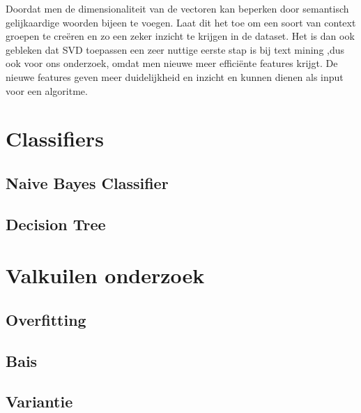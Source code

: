 Doordat men de dimensionaliteit van de vectoren kan beperken door semantisch gelijkaardige woorden bijeen te voegen. Laat dit het toe om een soort van context groepen te cre\"eren en zo een zeker inzicht te krijgen in de dataset. Het is dan ook gebleken dat SVD toepassen een zeer nuttige eerste stap is bij text mining \cite{maas2011learning},dus ook voor ons onderzoek, omdat men nieuwe meer effici\"ente features krijgt. De nieuwe features geven meer duidelijkheid en inzicht en kunnen dienen als input voor een algoritme.


\section{Classifiers}\label{Classifiers}

\subsection{Naive Bayes Classifier}\label{Naive Bayes Classifier}

\subsection{Decision Tree}\label{Decision Tree}

\section{Valkuilen onderzoek}\label{Valkuilen onderzoek}
\subsection{Overfitting}\label{Overfitting}
\subsection{Bais}\label{Bais}
\subsection{Variantie}\label{Variantie}